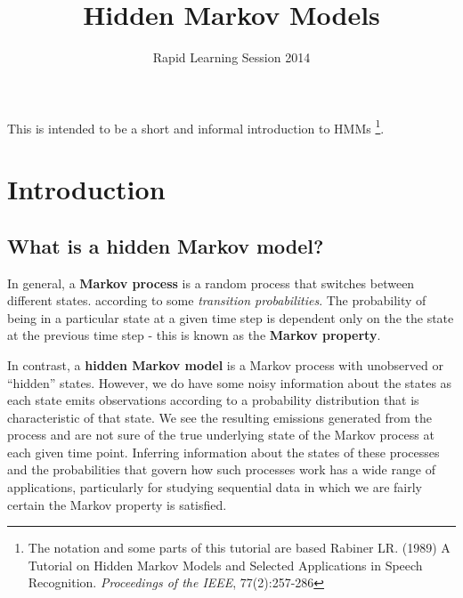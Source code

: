 \documentclass[11pt, oneside]{article}
\title{Hidden Markov Models}
\author{Rapid Learning Session 2014}
\date{}
\begin{document}
\maketitle

This is intended to be a short and informal introduction to HMMs
\footnote{The notation and some parts of this tutorial are based Rabiner LR. (1989) A Tutorial on Hidden Markov Models and Selected Applications in Speech Recognition. \textit{Proceedings of the IEEE}, 77(2):257-286}.

\section{Introduction}
\subsection{What is a hidden Markov model?}
In general, a \textbf{Markov process} is a random process that switches between different states.
according to some \textit{transition probabilities}. The probability of being in a particular state at a given time step is dependent only on the the state at the previous time step - this is known as the \textbf{Markov property}. %


In contrast, a \textbf{hidden Markov model} is a Markov process with unobserved or ``hidden'' states. However, we do have some noisy information about the states as each state emits observations according to a probability distribution that is characteristic of that state. We see the resulting emissions generated from the process and are not sure of the true underlying state of the Markov process at each given time point. Inferring information about the states of these processes and the probabilities that govern how such processes work has a wide range of applications, particularly for studying sequential data in which we are fairly certain the Markov property is satisfied.
\end{document}
